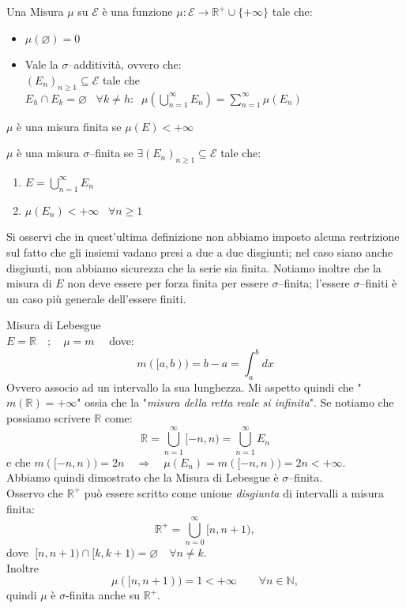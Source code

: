 \begin{definizione}
    Una Misura $\mu$ su $\mathscr{E}$ è una funzione $\mu:\mathscr{E}\rightarrow \mathbb{R}^+ \cup\{+ \infty\}$ tale che:
    \begin{itemize}
        \item [M.1)] $\mu(\varnothing) = 0$
        \item [M.2)] Vale la $\sigma$--additività, ovvero che:\\
        $(E_n)_{n \geq 1} \subseteq \mathscr{E}$ tale che $E_h \cap E_k = \varnothing \;\;\; \forall k \neq h: \;\; \mu(\bigcup_{n=1}^{\infty} E_n) = \sum_{n=1}^{\infty}\mu(E_n)$ 
    \end{itemize}
\end{definizione}

\begin{definizione}
    $\mu$ è una misura finita se $\mu(E) < +\infty$
\end{definizione}

\begin{definizione}
\label{def:sigmafinita}
    $\mu$ è una misura $\sigma$--finita se $\exists (E_n)_{n \geq 1} \subseteq \mathscr{E}$ tale che:
    \begin{enumerate}
        \item $E=\bigcup_{n=1}^{\infty} E_n$
        \item $\mu(E_n) < + \infty\;\;\;\forall n \geq1$
    \end{enumerate}
\end{definizione}

Si osservi che in quest'ultima definizione non abbiamo imposto alcuna restrizione sul fatto che gli insiemi vadano presi a due a due disgiunti; nel caso siano anche disgiunti, non abbiamo sicurezza che la serie sia finita. Notiamo inoltre che la misura di $E$ non deve essere per forza finita per essere $\sigma$--finita; l'essere $\sigma$--finiti è un caso più generale dell'essere finiti.

\begin{esempio}
    Misura di Lebesgue\\
    $E = \mathbb{R}\quad;\quad\mu=m\quad$ dove:
    \[m([a, b))= b-a= \int_a^bdx\] 
    Ovvero associo ad un intervallo la sua lunghezza. Mi aspetto quindi che "$m(\mathbb{R}) = +\infty$" ossia che la "\textit{misura della retta reale si infinita}". Se notiamo che possiamo scrivere $\mathbb{R}$ come: 
    \[\mathbb{R} = \bigcup_{n=1}^\infty [-n, n) = \bigcup_{n=1}^\infty E_n\]
    e che $m([-n, n)) = 2n \quad \Rightarrow \quad \mu (E_n) = m([-n, n)) = 2n < +\infty$.\\
    Abbiamo quindi dimostrato che la Misura di Lebesgue è $\sigma$--finita.\\
    Osservo che $\mathbb{R}^+$ può essere scritto come unione \emph{disgiunta} di intervalli a misura finita:
    \[
    \mathbb{R}^+ = \bigcup_{n=0}^{\infty} [n, n+1),
    \]
    dove $\;[n,n+1) \cap [k,k+1) = \varnothing \quad \forall n \neq k$.\\
    Inoltre
    \[
    \mu([n,n+1)) = 1 < +\infty \qquad \forall n \in \mathbb{N},
    \]
quindi $\mu$ è $\sigma$-finita anche su $\mathbb{R}^+$.
\end{esempio}

